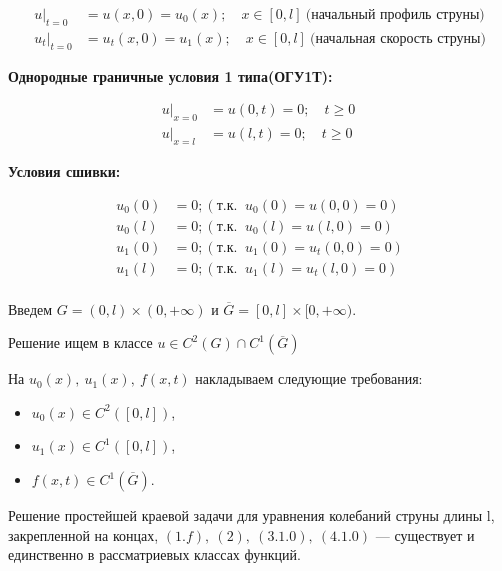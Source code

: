 \begin{equation}
	\begin{split}
		u|_{t=0} &= u(x, 0) = u_0(x);\quad x \in [0, l] \ \text{(начальный профиль струны)} \\
		u_t|_{t=0} &= u_t(x, 0) = u_1(x);\quad x \in [0, l] \ \text{(начальная скорость струны)}
	\end{split}
	\tag{2}
\end{equation}

\textbf{Однородные граничные условия 1 типа(ОГУ1Т):}

\begin{equation}
	\begin{split}
		u|_{x=0} &= u(0, t) = 0;\quad t \ge 0 \ \\
		u|_{x=l} &= u(l, t) = 0;\quad t \ge 0 \
	\end{split}
	\tag{3.1.0}
\end{equation}

\textbf{Условия сшивки:}

\begin{equation}
	\begin{split}
		u_0(0) &= 0;(\text{т.к. }\ u_0(0)=u(0, 0)=0)\\
		u_0(l) &= 0;(\text{т.к. }\ u_0(l)=u(l, 0)=0)\\
		u_1(0) &= 0;(\text{т.к. }\ u_1(0)=u_t(0, 0)=0)\\
		u_1(l) &= 0;(\text{т.к. }\ u_1(l)=u_t(l, 0)=0)\\
	\end{split}
	\tag{4.1.0}
\end{equation}

Введем $G=(0, l) \times (0, +\infty)$ и $\overline{G}=[0, l] \times [0, +\infty)$.

Решение ищем в классе $u \in C^2(G) \cap C^1(\overline{G})$

На $u_0(x),\ u_1(x),\ f(x,t)$ накладываем следующие требования:
\begin{itemize}[nosep, leftmargin=1.5cm]
	\item $u_0(x) \in C^2([0,l])$,
	\item $u_1(x) \in C^1([0,l])$,
	\item $f(x,t) \in C^1(\overline{G})$.
\end{itemize}

\begin{theorem}
	Решение простейшей краевой задачи для уравнения колебаний струны длины l, закрепленной на концах, $(1.f),\ (2),\ (3.1.0),\ (4.1.0)$ --- существует и единственно в рассматриевых классах функций.
\end{theorem}

